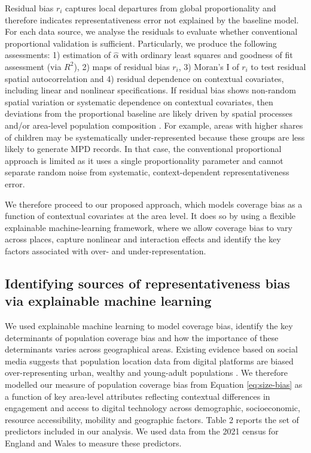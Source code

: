 \documentclass[]{rsos}%
\begin{document}
Residual bias \(r_i\) captures local departures from global
proportionality and therefore indicates representativeness error not
explained by the baseline model. For each data source, we analyse the
residuals to evaluate whether conventional proportional validation is
sufficient. Particularly, we produce the following assessments: 1)
estimation of \(\hat{\alpha}\) with ordinary least squares and goodness of
fit assessment (via \(R^2\)), 2) maps of residual bias \(r_i\), 3) Moran's I
of \(r_i\) to test residual spatial autocorrelation and 4) residual
dependence on contextual covariates, including linear and nonlinear
specifications. If residual bias shows non-random spatial variation or
systematic dependence on contextual covariates, then deviations from the
proportional baseline are likely driven by spatial processes and/or
area-level population composition \citep{Li2024}. For example, areas with
higher shares of children may be systematically under-represented
because these groups are less likely to generate MPD records. In that
case, the conventional proportional approach is limited as it uses a
single proportionality parameter and cannot separate random noise from
systematic, context-dependent representativeness error.

We therefore proceed to our proposed approach, which models coverage
bias as a function of contextual covariates at the area level. It does
so by using a flexible explainable machine-learning framework, where we
allow coverage bias to vary across places, capture nonlinear and
interaction effects and identify the key factors associated with over-
and under-representation.

\subsection{Identifying sources of representativeness bias via explainable machine learning}\label{sec-eml}

We used explainable machine learning to model coverage bias, identify
the key determinants of population coverage bias and how the importance
of these determinants varies across geographical areas. Existing
evidence based on social media suggests that population location data
from digital platforms are biased over-representing urban, wealthy and
young-adult populations \citep{blumenstock2010, wesolowski13-biases, schlosser21-biases}. We therefore modelled our measure of population
coverage bias from Equation \ref{eq:size-bias} as a function of key
area-level attributes reflecting contextual differences in engagement
and access to digital technology across demographic, socioeconomic,
resource accessibility, mobility and geographic factors. Table 2 reports
the set of predictors included in our analysis. We used data from the
2021 census for England and Wales to measure these predictors.
\end{document}
